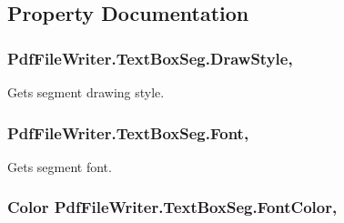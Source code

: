 \subsection{Property Documentation}
\subsubsection[{\texorpdfstring{Draw\+Style}{DrawStyle}}]{ Pdf\+File\+Writer.\+Text\+Box\+Seg.\+Draw\+Style\hspace{0.3cm}{\ttfamily [get]}, {\ttfamily [set]}}\hypertarget{class_pdf_file_writer_1_1_text_box_seg_ac71f2ff907fc05c43efadca22a5b9516}{}\label{class_pdf_file_writer_1_1_text_box_seg_ac71f2ff907fc05c43efadca22a5b9516}


Gets segment drawing style. 

\subsubsection[{\texorpdfstring{Font}{Font}}]{ Pdf\+File\+Writer.\+Text\+Box\+Seg.\+Font\hspace{0.3cm}{\ttfamily [get]}, {\ttfamily [set]}}\hypertarget{class_pdf_file_writer_1_1_text_box_seg_a84d800defbedc85809b43aa5e61f5021}{}\label{class_pdf_file_writer_1_1_text_box_seg_a84d800defbedc85809b43aa5e61f5021}


Gets segment font. 

\subsubsection[{\texorpdfstring{Font\+Color}{FontColor}}]{\setlength{\rightskip}{0pt plus 5cm}Color Pdf\+File\+Writer.\+Text\+Box\+Seg.\+Font\+Color\hspace{0.3cm}{\ttfamily [get]}, {\ttfamily [set]}}\hypertarget{class_pdf_file_writer_1_1_text_box_seg_abfc443282401e8293c4046f0e89008cf}{}\label{class_pdf_file_writer_1_1_text_box_seg_abfc443282401e8293c4046f0e89008cf}


